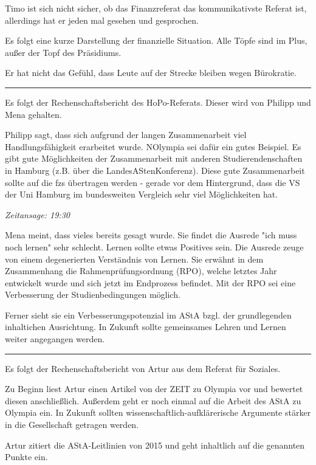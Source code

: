 \documentclass[ngerman,headheight=70pt]{scrartcl}
\begin{document}
    Timo ist sich nicht sicher, ob das Finanzreferat das kommunikativste Referat
    ist, allerdings hat er jeden mal gesehen und gesprochen.

    Es folgt eine kurze Darstellung der finanzielle Situation. Alle Töpfe sind im
    Plus, außer der Topf des Präsidiums.

    Er hat nicht das Gefühl, dass Leute auf der Strecke bleiben wegen Bürokratie.

    \hrule

    Es folgt der Rechenschaftsbericht des HoPo-Referats. Dieser wird von Philipp
    und Mena gehalten.

    Philipp sagt, dass sich aufgrund der langen Zusammenarbeit viel Handlungsfähigkeit
    erarbeitet wurde. NOlympia sei dafür ein gutes Beispiel. Es gibt gute
    Möglichkeiten der Zusammenarbeit mit anderen Studierendenschaften in Hamburg
    (z.B. über die LandesAStenKonferenz). Diese gute Zusammenarbeit sollte auf
    die fzs übertragen werden - gerade vor dem Hintergrund, dass die VS der Uni
    Hamburg im bundesweiten Vergleich sehr viel Möglichkeiten hat.

    \textit{Zeitansage: 19:30}

    Mena meint, dass vieles bereits gesagt wurde. Sie findet die Ausrede "ich
    muss noch lernen" sehr schlecht. Lernen sollte etwas Positives sein. Die Ausrede
    zeuge von einem degenerierten Verständnis von Lernen. Sie erwähnt in dem
    Zusammenhang die Rahmenprüfungsordnung (RPO), welche letztes Jahr entwickelt wurde
    und sich jetzt im Endprozess befindet. Mit der RPO sei eine Verbesserung der
    Studienbedingungen möglich.

    Ferner sieht sie ein Verbesserungspotenzial im AStA bzgl. der grundlegenden
    inhaltichen Ausrichtung. In Zukunft sollte gemeinsames Lehren und Lernen
    weiter angegangen werden.

    \hrule

    Es folgt der Rechenschaftsbericht von Artur aus dem Referat für Soziales.

    Zu Beginn liest Artur einen Artikel von der ZEIT zu Olympia vor und bewertet
    diesen anschließlich. Außerdem geht er noch einmal auf die Arbeit des AStA
    zu Olympia ein. In Zukunft sollten wissenschaftlich-aufklärerische Argumente
    stärker in die Gesellschaft getragen werden.

    Artur zitiert die AStA-Leitlinien von 2015 und geht inhaltlich auf die
    genannten Punkte ein.
\end{document}
